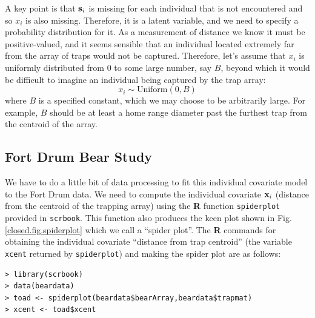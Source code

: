 A key point is that ${\bf s}_{i}$ is missing for each individual that
is not encountered and so $x_{i}$ is also missing. Therefore, it is a
latent variable, and we need to specify a probability distribution for
it.  As a measurement of distance we know it must be positive-valued,
and it seems sensible that an individual located extremely far from
the array of traps would not be captured.  Therefore, let's assume
that $x_{i}$ is uniformly distributed from $0$ to some large number,
say $B$, beyond which it would be difficult to imagine an individual
being captured by the trap array:
\[
 x_{i} \sim \mbox{Uniform}(0,B)
\]
where $B$ is a specified constant, which we may choose to be
arbitrarily large.
For example, $B$ should be at least a home
range diameter past the furthest trap from the centroid of the array.


\subsection{Fort Drum Bear Study}


We have to do a little bit of data processing to fit this individual
covariate model to the Fort Drum data.  We need to compute the
individual covariate ${\bf x}_{i}$ (distance from the centroid of the
trapping array) using the {\bf R} function \mbox{\tt spiderplot}
provided in \mbox{\tt scrbook}. This function also produces the keen
plot shown in Fig. \ref{closed.fig.spiderplot} which we call a
``spider plot''.  The {\bf R} commands for obtaining the individual
covariate ``distance from trap centroid'' (the variable \mbox{\tt
  xcent} returned by \mbox{\tt spiderplot}) and making the spider plot
are as follows:
\begin{verbatim}
> library(scrbook)
> data(beardata)
> toad <- spiderplot(beardata$bearArray,beardata$trapmat)
> xcent <- toad$xcent
\end{verbatim}


